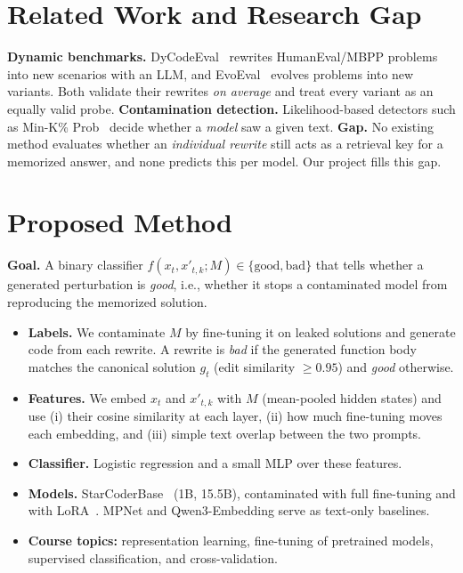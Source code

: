 \documentclass[10pt,twocolumn,letterpaper]{article}
\newcommand{\tightlist}{\setlength\itemsep{0pt}\setlength\parsep{0pt}\setlength\topsep{0pt}}
\begin{document}
\section{Related Work and Research Gap}

\textbf{Dynamic benchmarks.} DyCodeEval~\cite{dycodeeval} rewrites HumanEval/MBPP problems into new scenarios with an LLM, and EvoEval~\cite{evoeval} evolves problems into new variants. Both validate their rewrites \emph{on average} and treat every variant as an equally valid probe. \textbf{Contamination detection.} Likelihood-based detectors such as Min-K\% Prob~\cite{mink} decide whether a \emph{model} saw a given text. \textbf{Gap.} No existing method evaluates whether an \emph{individual rewrite} still acts as a retrieval key for a memorized answer, and none predicts this per model. Our project fills this gap.

\section{Proposed Method}

\textbf{Goal.} A binary classifier $f(x_t, x'_{t,k}; M)\in\{\text{good},\text{bad}\}$ that tells whether a generated perturbation is \emph{good}, i.e., whether it stops a contaminated model from reproducing the memorized solution.
\begin{itemize}\tightlist
\item \textbf{Labels.} We contaminate $M$ by fine-tuning it on leaked solutions and generate code from each rewrite. A rewrite is \emph{bad} if the generated function body matches the canonical solution $g_t$ (edit similarity $\geq 0.95$) and \emph{good} otherwise.
\item \textbf{Features.} We embed $x_t$ and $x'_{t,k}$ with $M$ (mean-pooled hidden states) and use (i) their cosine similarity at each layer, (ii) how much fine-tuning moves each embedding, and (iii) simple text overlap between the two prompts.
\item \textbf{Classifier.} Logistic regression and a small MLP over these features.
\item \textbf{Models.} StarCoderBase~\cite{starcoder} (1B, 15.5B), contaminated with full fine-tuning and with LoRA~\cite{lora}. MPNet and Qwen3-Embedding serve as text-only baselines.
\item \textbf{Course topics:} representation learning, fine-tuning of pretrained models, supervised classification, and cross-validation.
\end{itemize}
\end{document}
